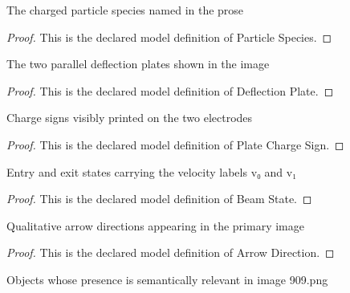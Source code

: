 \begin{definition}
  \label{def:physics:phyx-mini-0909:phyxminiproblems-problemphyxmini0909-particlespecies}
  The charged particle species named in the prose
\end{definition}
\begin{proof}
  This is the declared model definition of Particle Species.
\end{proof}
\begin{definition}
  \label{def:physics:phyx-mini-0909:phyxminiproblems-problemphyxmini0909-deflectionplate}
  The two parallel deflection plates shown in the image
\end{definition}
\begin{proof}
  This is the declared model definition of Deflection Plate.
\end{proof}
\begin{definition}
  \label{def:physics:phyx-mini-0909:phyxminiproblems-problemphyxmini0909-platechargesign}
  Charge signs visibly printed on the two electrodes
\end{definition}
\begin{proof}
  This is the declared model definition of Plate Charge Sign.
\end{proof}
\begin{definition}
  \label{def:physics:phyx-mini-0909:phyxminiproblems-problemphyxmini0909-beamstate}
  Entry and exit states carrying the velocity labels v₀ and v₁
\end{definition}
\begin{proof}
  This is the declared model definition of Beam State.
\end{proof}
\begin{definition}
  \label{def:physics:phyx-mini-0909:phyxminiproblems-problemphyxmini0909-arrowdirection}
  Qualitative arrow directions appearing in the primary image
\end{definition}
\begin{proof}
  This is the declared model definition of Arrow Direction.
\end{proof}
\begin{definition}
  \label{def:physics:phyx-mini-0909:phyxminiproblems-problemphyxmini0909-figureobject}
  Objects whose presence is semantically relevant in image 909.png
\end{definition}
